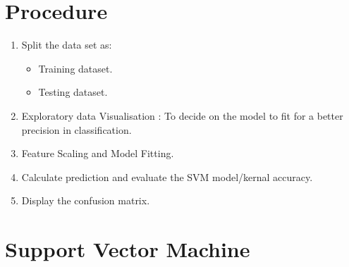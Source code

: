\documentclass[a4paper,10pt]{article}
\begin{document}
\section{Procedure}

\begin{enumerate}
	\item Split the data set as:
	\begin{itemize}
		\item Training dataset.
		\item Testing dataset.
	\end{itemize}
	\item Exploratory data Visualisation : To decide on the model to fit for a better precision in classification.
	\item Feature Scaling and Model Fitting.
	\item Calculate prediction and evaluate the SVM model/kernal accuracy.
	\item Display the confusion matrix.
\end{enumerate}	

\section{Support Vector Machine}
\end{document}
